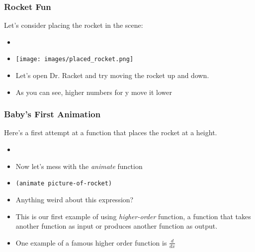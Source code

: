 \documentclass{beamer}
\begin{document}

\begin{frame}
  \frametitle{Rocket Fun}
  Let's consider placing the rocket in the scene:
  \begin{itemize}
  \item<2->[] \placeRocket
  \item<3-> \texttt{[image: images/placed\_rocket.png]}
  \item<4-> Let's open Dr. Racket and try moving the rocket up and down.
  \item<5-> As you can see, higher numbers for y move it lower
  \end{itemize}
\end{frame}




\begin{frame}
  \frametitle{Baby's First Animation}
  Here's a first attempt at a function that places the rocket at a height.
  \begin{itemize}
  \item \placeRocket
  \item<2-> Now let's mess with the \emph{animate} function
  \item<3-> \texttt{(animate picture-of-rocket)}
  \item<4-> Anything weird about this expression?
  \item<5-> This is our first example of using \emph{higher-order} function,
    a function that takes another function as input or produces another function
    as output.
  \item<6-> One example of a famous higher order function is $\frac{d}{dx}$
  \end{itemize}
\end{frame}
\end{document}
